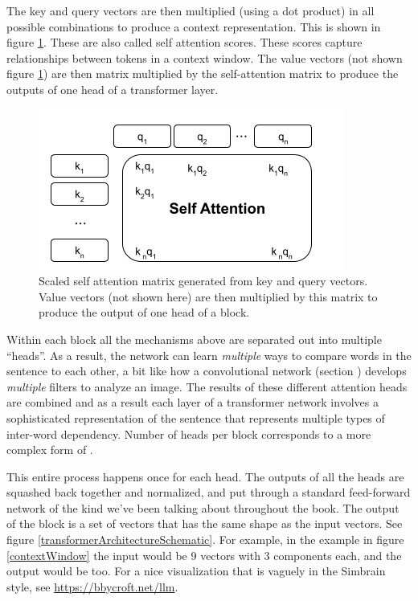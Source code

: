 The key and query vectors are then multiplied (using a dot product) in all possible combinations to produce a context representation.  This is shown in figure \ref{selfAttention}. These are also called self attention scores. These scores capture relationships between tokens in a context window.  The value vectors (not shown figure \ref{selfAttention}) are then matrix multiplied by the self-attention matrix to produce the outputs of one head of a transformer layer.

\begin{figure}[h]
\centering
\includegraphics[scale=.6]{./images/selfAttention.png}
\caption[Jeff Yoshimi with consultation from Tim Meyer.]{Scaled self attention matrix generated from key and query vectors. Value vectors (not shown here) are then multiplied by this matrix to produce the output of one head of a block.}
\label{selfAttention}
\end{figure}

Within each block all the mechanisms above are separated out into multiple ``heads''. As a result, the network can learn \emph{multiple} ways to compare words in the sentence to each other, a bit like how a convolutional network (section ) develops \emph{multiple} filters to analyze an image. The results of these different attention heads are combined and as a result each layer of a transformer network involves a sophisticated representation of the sentence that represents multiple types of inter-word dependency. Number of heads per block corresponds to a more complex form of .

This entire process happens once for each head. The outputs of all the heads are squashed back together and normalized, and put through a standard feed-forward network of the kind we've been talking about throughout the book. The output of the block is a set of vectors that has the same shape as the input vectors. See figure \ref{transformerArchitectureSchematic}.  For example, in the example in figure \ref{contextWindow} the input would be 9 vectors with 3 components each, and the output would be too. For a nice visualization that is vaguely in the Simbrain style, see \url{https://bbycroft.net/llm}.

